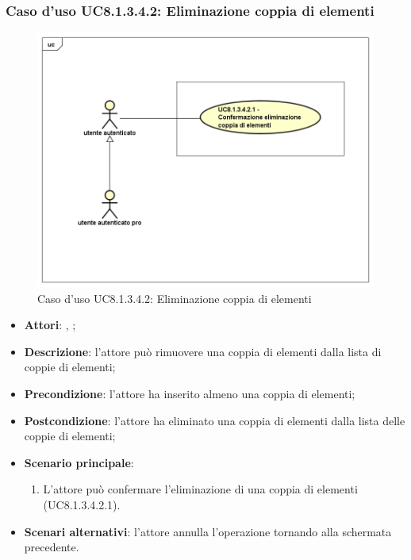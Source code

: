 	\subsubsection{Caso d'uso UC8.1.3.4.2: Eliminazione coppia di elementi}
	\label{UC8.1.3.4.2}
	\begin{figure}[h]
		\centering
		\includegraphics[scale=0.5,keepaspectratio]{UML/UC8_1_3_4_2.png}
		\caption{Caso d'uso UC8.1.3.4.2: Eliminazione coppia di elementi}
	\end{figure}
	\FloatBarrier
	\begin{itemize}
		\item \textbf{Attori}: \uau, \uaupro;
		\item \textbf{Descrizione}: l'attore può rimuovere una coppia di elementi dalla lista di coppie di elementi;
		\item \textbf{Precondizione}: l'attore ha inserito almeno una coppia di elementi;
		\item \textbf{Postcondizione}: l'attore ha eliminato una coppia di elementi dalla lista delle coppie di elementi;
		\item \textbf{Scenario principale}: 
		\begin{enumerate}
		\item L'attore può confermare l'eliminazione di una coppia di elementi (UC8.1.3.4.2.1).
		\end{enumerate}	
		\item \textbf{Scenari alternativi}: l'attore annulla l'operazione tornando alla schermata precedente.
	\end{itemize}

